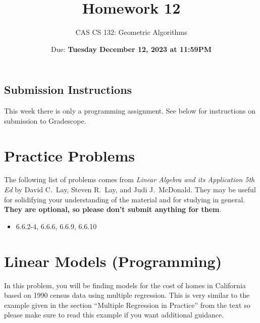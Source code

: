 \documentclass{article}
\title{
  Homework 12
}
\author{CAS CS 132: Geometric Algorithms}
\date{Due: \textbf{Tuesday December 12, 2023 at 11:59PM}}
\theoremstyle{remark}
\begin{document}
\maketitle

\subsection*{Submission Instructions}
This week there is only a programming assignment.
See below for instructions on submission to Gradescope.

\section*{Practice Problems}

The following list of problems comes from \textit{Linear Algebra and its Application 5th Ed} by David C.\ Lay, Steven R.\ Lay, and Judi J.\ McDonald.
They may be useful for solidifying your understanding of the material and for studying in general.
\textbf{They are optional, so please don't submit anything for them}.

\begin{itemize}
\item 6.6.2-4, 6.6.6, 6.6.9, 6.6.10
\end{itemize}

\pagebreak
\section{Linear Models (Programming)}

In this problem, you will be finding models for the cost of homes in California based on 1990 census data using multiple regression.
This is very similar to the example given in the section ``Multiple Regression in Practice'' from the text so please make sure to read this example if you want additional guidance.
\end{document}
